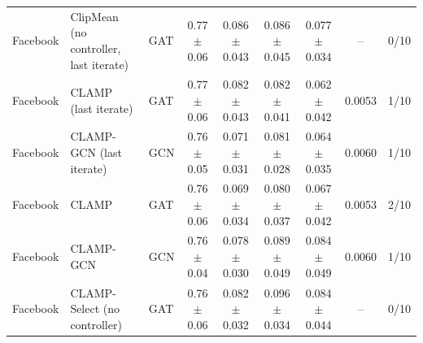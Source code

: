 \begin{longtable}{lp{3.2cm}lcccccc}
Facebook & ClipMean (no controller, last iterate) & GAT & 0.77$\pm$0.06 & 0.086$\pm$0.043 & 0.086$\pm$0.045 & 0.077$\pm$0.034 & -- & 0/10 \\
Facebook & CLAMP (last iterate) & GAT & 0.77$\pm$0.06 & 0.082$\pm$0.043 & 0.082$\pm$0.041 & 0.062$\pm$0.042 & 0.0053 & 1/10 \\
Facebook & CLAMP-GCN (last iterate) & GCN & 0.76$\pm$0.05 & 0.071$\pm$0.031 & 0.081$\pm$0.028 & 0.064$\pm$0.035 & 0.0060 & 1/10 \\
Facebook & CLAMP & GAT & 0.76$\pm$0.06 & 0.069$\pm$0.034 & 0.080$\pm$0.037 & 0.067$\pm$0.042 & 0.0053 & 2/10 \\
Facebook & CLAMP-GCN & GCN & 0.76$\pm$0.04 & 0.078$\pm$0.030 & 0.089$\pm$0.049 & 0.084$\pm$0.049 & 0.0060 & 1/10 \\
Facebook & CLAMP-Select (no controller) & GAT & 0.76$\pm$0.06 & 0.082$\pm$0.032 & 0.096$\pm$0.034 & 0.084$\pm$0.044 & -- & 0/10 \\
\end{longtable}
